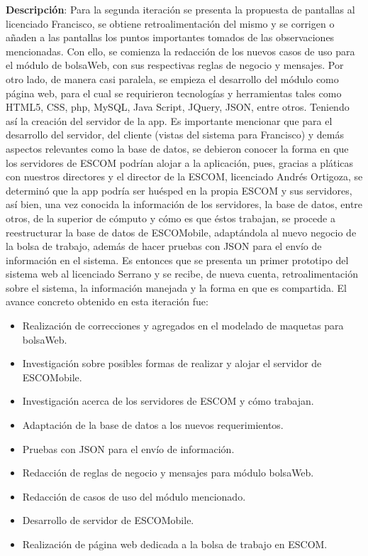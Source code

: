 \noindent
\textbf{Descripción}: Para la segunda iteración se presenta la propuesta de pantallas al licenciado Francisco, se obtiene retroalimentación del mismo y se corrigen o añaden a las pantallas los puntos importantes tomados de las observaciones mencionadas. Con ello, se comienza la redacción de los nuevos casos de uso para el módulo de bolsaWeb, con sus respectivas reglas de negocio y mensajes.
\newline
\newline
Por otro lado, de manera casi paralela, se empieza el desarrollo del módulo como página web, para el cual se requirieron tecnologías y herramientas tales como HTML5, CSS, php, MySQL, Java Script, JQuery, JSON, entre otros. Teniendo así la creación del servidor de la app. Es importante mencionar que para el desarrollo del servidor, del cliente (vistas del sistema para Francisco) y demás aspectos relevantes como la base de datos, se debieron conocer la forma en que los servidores de ESCOM podrían alojar a la aplicación, pues, gracias a pláticas con nuestros directores y el director de la ESCOM, licenciado Andrés Ortigoza, se determinó que la app podría ser huésped en la propia ESCOM y sus servidores, así bien, una vez conocida la información de los servidores, la base de datos, entre otros, de la superior de cómputo y cómo es que éstos trabajan, se procede a reestructurar la base de datos de ESCOMobile, adaptándola al nuevo negocio de la bolsa de trabajo, además de hacer pruebas con JSON para el envío de información en el sistema.
\newline
Es entonces que se presenta un primer prototipo del sistema web al licenciado Serrano y se recibe, de nueva cuenta, retroalimentación sobre el sistema, la información manejada y la forma en que es compartida. 
\newline
El avance concreto obtenido en esta iteración fue: 
\begin{itemize}
	\item Realización de correcciones y agregados en el modelado de maquetas para bolsaWeb.
	\item Investigación sobre posibles formas de realizar y alojar el servidor de ESCOMobile.
	\item Investigación acerca de los servidores de ESCOM y cómo trabajan.
	\item Adaptación de la base de datos a los nuevos requerimientos.
	\item Pruebas con JSON para el envío de información.
	\item Redacción de reglas de negocio y mensajes para módulo bolsaWeb.
	\item Redacción de casos de uso del módulo mencionado.
	\item Desarrollo de servidor de ESCOMobile.
	\item Realización de página web dedicada a la bolsa de trabajo en ESCOM.
\end{itemize}


